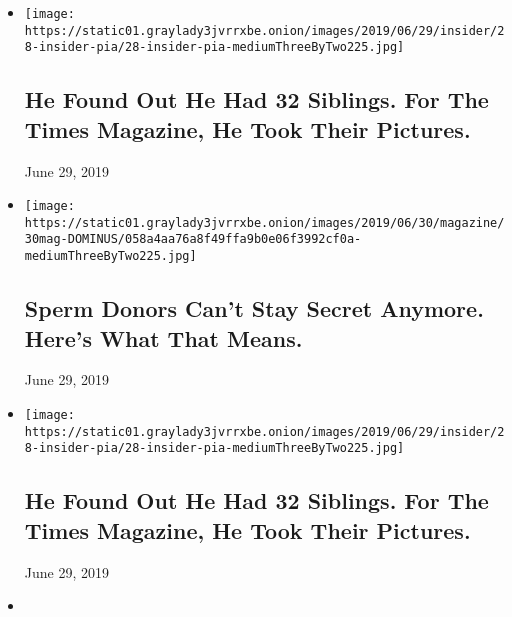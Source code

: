 \begin{itemize}
\item
  \href{https://www.nytimes3xbfgragh.onion/2019/06/29/reader-center/sperm-donor-siblings.html}{}

  \texttt{[image: https://static01.graylady3jvrrxbe.onion/images/2019/06/29/insider/28-insider-pia/28-insider-pia-mediumThreeByTwo225.jpg]}

  \hypertarget{he-found-out-he-had-32-siblings-for-the-times-magazine-he-took-their-pictures}{%
  \subsection{He Found Out He Had 32 Siblings. For The Times Magazine,
  He Took Their
  Pictures.}\label{he-found-out-he-had-32-siblings-for-the-times-magazine-he-took-their-pictures}}

  June 29, 2019
\item
  \href{https://www.nytimes3xbfgragh.onion/2019/06/26/magazine/sperm-donor-questions.html}{}

  \texttt{[image: https://static01.graylady3jvrrxbe.onion/images/2019/06/30/magazine/30mag-DOMINUS/058a4aa76a8f49ffa9b0e06f3992cf0a-mediumThreeByTwo225.jpg]}

  \hypertarget{sperm-donors-cant-stay-secret-anymore-heres-what-that-means}{%
  \subsection{Sperm Donors Can't Stay Secret Anymore. Here's What That
  Means.}\label{sperm-donors-cant-stay-secret-anymore-heres-what-that-means}}

  June 29, 2019
\item
  \href{https://www.nytimes3xbfgragh.onion/2019/06/29/reader-center/sperm-donor-siblings.html}{}

  \texttt{[image: https://static01.graylady3jvrrxbe.onion/images/2019/06/29/insider/28-insider-pia/28-insider-pia-mediumThreeByTwo225.jpg]}

  \hypertarget{he-found-out-he-had-32-siblings-for-the-times-magazine-he-took-their-pictures-1}{%
  \subsection{He Found Out He Had 32 Siblings. For The Times Magazine,
  He Took Their
  Pictures.}\label{he-found-out-he-had-32-siblings-for-the-times-magazine-he-took-their-pictures-1}}

  June 29, 2019
\item
  \href{https://www.nytimes3xbfgragh.onion/2015/07/12/magazine/the-mixed-up-brothers-of-bogota.html}{}


\end{itemize}
